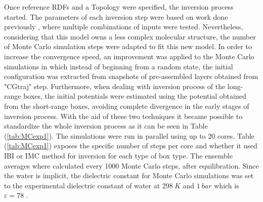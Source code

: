 \documentclass[10pt,a4paper,twoside]{article}
\begin{document}
 Once reference RDFs and a Topology were specified, the inversion process started. The parameters of each inversion step were based on work done previously \cite{myproj}, where multiple combinations of inputs were tested. Nevertheless, considering that this model owns a less complex molecular structure, the number of Monte Carlo simulation steps were adapted to fit this new model. In order to increase the convergence speed, an improvement was applied to the Monte Carlo simulations in which instead of beginning from a random state, the initial configuration was extracted from snapshots of pre-assembled layers obtained from "CGtraj" step. Furthermore, when dealing with inversion process of the long-range boxes, the initial potentials were estimated using the potential obtained from the short-range boxes, avoiding complete divergence in the early stages of inversion process. With the aid of these two techniques it became possible to standardize the whole inversion process as it can be seen in Table (\ref{tab:MCexp1}).  The simulations were run in parallel using up to 20 cores. Table (\ref{tab:MCexp1}) exposes the specific number of steps per core and whether it used IBI or IMC method for inversion for each type of box type. The ensemble  averages where calculated every 1000 Monte Carlo steps, after equilibration. Since the water is implicit, the dielectric constant for Monte Carlo simulations was set to the experimental dielectric constant of water at $298\ K$ and $1\ bar$ which is $\varepsilon = 78$ \cite{dconst}. 
  
\end{document}

